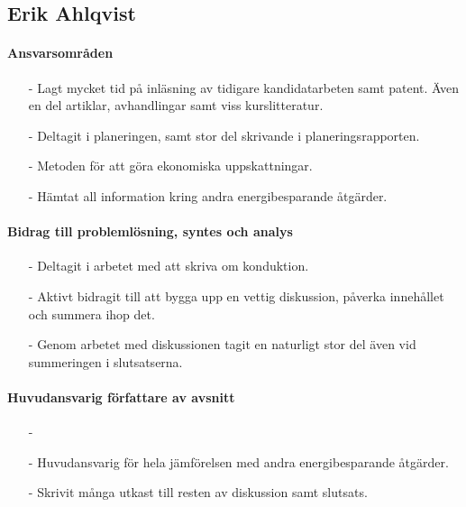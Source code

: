 \documentclass[12pt,a4paper]{article}
\begin{document}
\subsection*{Erik Ahlqvist}

\paragraph{Ansvarsområden}

\begin{itemize}
\item[-] Lagt mycket tid på inläsning av tidigare kandidatarbeten samt patent. Även en del artiklar, avhandlingar samt viss kurslitteratur. 
\item[-] Deltagit i planeringen, samt stor del skrivande i planeringsrapporten.
\item[-] Metoden för att göra ekonomiska uppskattningar.
\item[-] Hämtat all information kring andra energibesparande åtgärder. 
\end{itemize}


\paragraph{Bidrag till problemlösning, syntes och analys}

\begin{itemize}
\item[-] Deltagit i arbetet med att skriva om konduktion.
\item[-] Aktivt bidragit till att bygga upp en vettig diskussion, påverka innehållet och summera ihop det.
\item[-] Genom arbetet med diskussionen tagit en naturligt stor del även vid summeringen i slutsatserna.
\end{itemize}


\paragraph{Huvudansvarig författare av avsnitt}

\begin{itemize}
\item[-] 
\item[-] Huvudansvarig för hela jämförelsen med andra energibesparande åtgärder.
\item[-] Skrivit många utkast till resten av diskussion samt slutsats.
\end{itemize}
\end{document}
